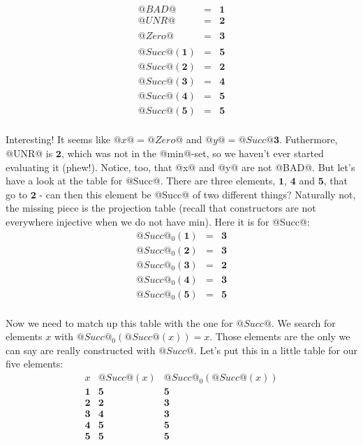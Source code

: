 \[\begin{array}{lcl}
@BAD@ & = & \mathbf{1} \\
@UNR@ & = & \mathbf{2} \\
\\
@Zero@ & = & \mathbf{3} \\
\\
@Succ@(\mathbf{1}) & = & \mathbf{5} \\
@Succ@(\mathbf{2}) & = & \mathbf{2} \\
@Succ@(\mathbf{3}) & = & \mathbf{4} \\
@Succ@(\mathbf{4}) & = & \mathbf{5} \\
@Succ@(\mathbf{5}) & = & \mathbf{5} \\
\end{array}\]

Interesting! It seems like $@x@ = @Zero@$ and $@y@ = @Succ @\mathbf{3}$.
Futhermore, @UNR@ is $\mathbf{2}$, which was not in the @min@-set, so
we haven't ever started evaluating it (phew!). Notice, too, that @x@
and @y@ are not @BAD@. But let's have a look at the table for
@Succ@. There are three elements, $\mathbf{1}$, $\mathbf{4}$ and
$\mathbf{5}$, that go to $\mathbf{2}$ - can then this element be
@Succ@ of two different things? Naturally not, the missing piece is
the projection table (recall that constructors are not everywhere
injective when we do not have min). Here it is for @Succ@:
\[\begin{array}{lcl}
@Succ@_0(\mathbf{1}) & = & \mathbf{3} \\
@Succ@_0(\mathbf{2}) & = & \mathbf{3} \\
@Succ@_0(\mathbf{3}) & = & \mathbf{2} \\
@Succ@_0(\mathbf{4}) & = & \mathbf{3} \\
@Succ@_0(\mathbf{5}) & = & \mathbf{5} \\
\end{array}\]

Now we need to match up this table with the one for $@Succ@$. We
search for elements $x$ with $@Succ@_0(@Succ@(x)) = x$. Those
elements are the only we can say are really constructed with $@Succ@$.
Let's put this in a little table for our five elements:
\[\begin{array}{ccc}
x          & @Succ@(x)  & @Succ@_0(@Succ@(x)) \\
\mathbf{1} & \mathbf{5} & \mathbf{5} \\
\mathbf{2} & \mathbf{2} & \mathbf{3} \\
\mathbf{3} & \mathbf{4} & \mathbf{3} \\
\mathbf{4} & \mathbf{5} & \mathbf{5} \\
\mathbf{5} & \mathbf{5} & \mathbf{5} \\
\end{array}\]

